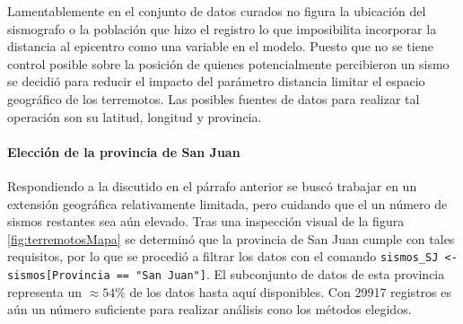 \documentclass[a4paper]{report}
\begin{document}
Lamentablemente en el conjunto de datos curados no figura la ubicación del sismografo o la población que hizo el registro lo que imposibilita incorporar la distancia al epicentro como una variable en el modelo.%
Puesto que no se tiene control posible sobre la posición de quienes potencialmente percibieron un sismo se decidió para reducir el impacto del parámetro distancia limitar el espacio geográfico de los terremotos.
Las posibles fuentes de datos para realizar tal operación son su latitud, longitud y provincia.


\paragraph{Elección de la provincia de San Juan}
Respondiendo a la discutido en el párrafo anterior se buscó trabajar en un extensión geográfica relativamente limitada, pero cuidando que el un número de sismos restantes sea aún elevado.
Tras una inspección visual de la figura \ref{fig:terremotosMapa} se determinó  que la provincia de San Juan cumple con tales requisitos, por lo que se procedió a filtrar los datos con el comando \verb'sismos_SJ <- sismos[Provincia == "San Juan"]'.
El subconjunto de datos de esta provincia representa un \(\approx 54 \%\) de los datos hasta aquí disponibles.
Con \num{29917} registros es aún un número suficiente para realizar análisis cono los métodos elegidos.

\end{document}
